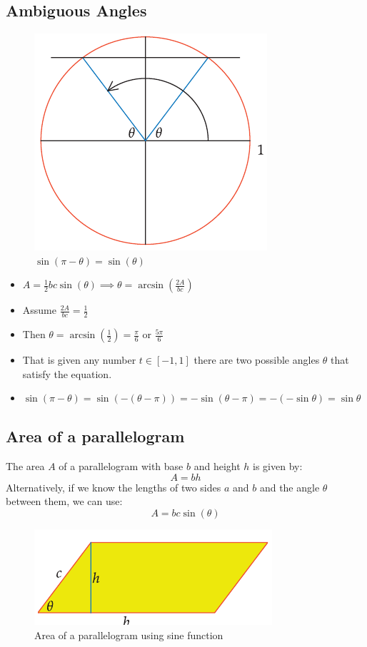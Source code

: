 \subsection{Ambiguous Angles}
\begin{figure}
    \centering
    \includegraphics[scale=0.3]{pics/26.png}
    \caption{$\sin(\pi - \theta) = \sin(\theta)$}
\end{figure}
\begin{itemize}
    \item  $A = \frac{1}{2} b c \sin(\theta) \implies \theta = \arcsin\left(\frac{2A}{bc}\right) $
    \item Assume $ \frac{2A}{bc} = \frac{1}{2} $
    \item Then $ \theta = \arcsin\left(\frac{1}{2}\right) = \frac{\pi}{6} $ or $ \frac{5\pi}{6} $
    \item That is given any number $t \in [-1,1]$ there are two possible angles $\theta$ that satisfy the equation.
    \item $\sin (\pi - \theta) = \sin(-(\theta - \pi )) = - \sin(\theta - \pi) = -(-\sin \theta) = \sin \theta $
\end{itemize}

\subsection{Area of a parallelogram}
The area $A$ of a parallelogram with base $b$ and height $h$ is given by:
\[ A = b h \]
Alternatively, if we know the lengths of two sides $a$ and $b$ and the angle $\theta$ between them, we can use:
\[ A =  bc \sin(\theta) \]
\begin{figure}
    \centering
    \includegraphics[scale=0.3]{pics/27.png}
    \caption{Area of a parallelogram using sine function}
\end{figure}

